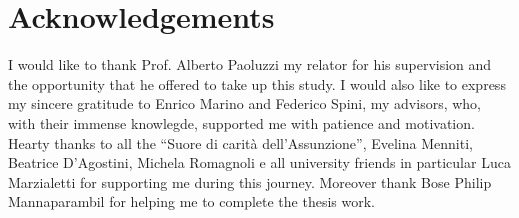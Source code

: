 \chapter{Acknowledgements}
\label{cha:acknowledgements}
I would like to thank Prof. Alberto Paoluzzi my relator for his supervision and the opportunity that he offered to take up this study. I would also like to express my sincere gratitude to Enrico Marino and Federico Spini, my advisors, who, with their immense knowlegde, supported me with patience and  motivation.
\newline
Hearty thanks to all the “Suore di carità dell'Assunzione”, Evelina Menniti, Beatrice D'Agostini, Michela Romagnoli e all university friends in particular Luca Marzialetti for supporting me during this journey.
\newline
Moreover thank Bose Philip Mannaparambil for helping me to complete the thesis work.